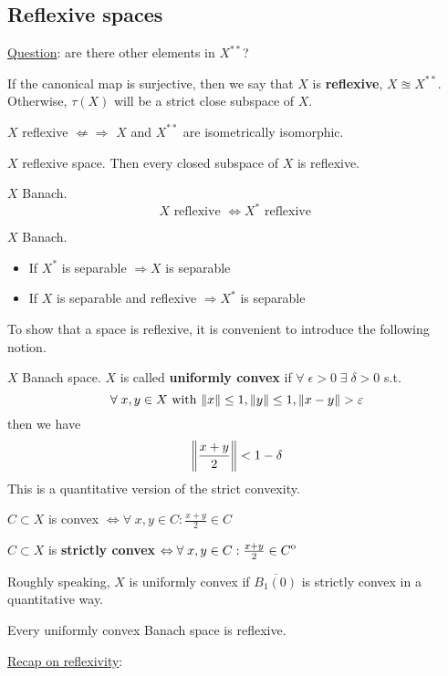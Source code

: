 \subsection{Reflexive spaces}
\noindent\underline{Question}: are there other elements in \(X^{**}\)?
\begin{definition}
    If the canonical map is surjective, then we say that \(X\) is \textbf{reflexive}, \(X \approxeq X^{**}\). Otherwise, \(\tau(X)\) will be a strict close subspace of \(X\).
\end{definition}
\begin{remark}
    \(X\) reflexive \({\displaystyle\nLeftarrow}{\Rightarrow}\) \(X\) and \(X^{**}\) are isometrically isomorphic.
\end{remark}
\begin{theorem}
    \(X\) reflexive space. Then every closed subspace of \(X\) is reflexive.
\end{theorem}
\begin{theorem}
    \(X\) Banach. 
    \[
        X \mbox{ reflexive } \Leftrightarrow X^* \mbox{ reflexive }
    \]
\end{theorem}
\begin{theorem}
    \(X\) Banach.
    \begin{itemize}
        \item If \(X^*\) is separable \(\Rightarrow X\) is separable
        \item If \(X\) is separable and reflexive \(\Rightarrow X^*\) is separable
    \end{itemize}
\end{theorem}
To show that a space is reflexive, it is convenient to introduce the following notion.
\begin{definition}
    \(X\) Banach space. \(X\) is called \textbf{uniformly convex} if \(\forall \; \epsilon > 0 \; \exists \; \delta > 0 \) s.t. 
    \[
        \forall \; x, y \in X \mbox{ with } \norm{x} \leq 1, \norm{y} \leq 1, \norm{x-y} > \varepsilon
    \]
    then we have 
    \[
        \norm{\frac{x+y}{2}} < 1-\delta
    \]
    This is a quantitative version of the strict convexity.
\end{definition}
\begin{definition}
    \(C \subset X\) is convex  \(\Leftrightarrow \forall \; x,y \in C : \frac{x+y}{2} \in C\)

    \noindent \(C \subset X\) is \textbf{strictly convex} \(\Leftrightarrow \forall \; x,y \in C : \frac{x+y}{2} \in {\kern0ptC}^{\mathrm{o}}\)
\end{definition}
Roughly speaking, \(X\) is uniformly convex if \(\overline{B_1(0)}\) is strictly convex in a quantitative way.
\begin{theorem}
    Every uniformly convex Banach space is reflexive.
\end{theorem}
\noindent\underline{Recap on reflexivity}:

